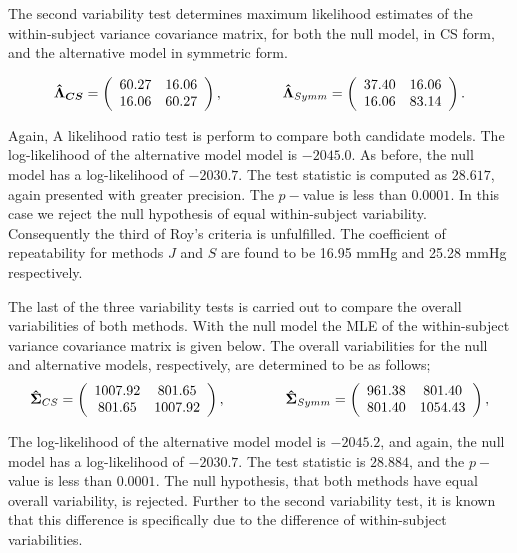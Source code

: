 \documentclass[12pt, a4paper]{report}
\theoremstyle{plain}
\theoremstyle{definition}
\theoremstyle{remark}
\begin{document}
	The second variability test determines maximum likelihood estimates of the within-subject variance covariance matrix, for both the null model, in CS form, and the alternative model in symmetric form.
	
	\[
	\boldsymbol{\hat{\Lambda}_{CS}} = \left( \begin{array}{cc}
	60.27  & 16.06  \\
	16.06  & 60.27  \\
	\end{array}\right),
	\hspace{1.5cm}
	\boldsymbol{\hat{\Lambda}}_{Symm} = \left( \begin{array}{cc}
	37.40 & 16.06  \\
	16.06 & 83.14  \\
	\end{array}\right).
	\]
	
	Again, A likelihood ratio test is perform to compare both candidate models. The log-likelihood of the alternative model model is $-2045.0$. As before, the null model has a log-likelihood of $-2030.7$. The test statistic is computed as $28.617$, again presented with greater precision. The $p-$value is less than $0.0001$. In this case we reject the null hypothesis of equal within-subject variability. Consequently the third of Roy's criteria is unfulfilled.
	The coefficient of repeatability for methods $J$ and $S$ are found to be 16.95 mmHg and 25.28 mmHg respectively.
	
	The last of the three variability tests is carried out to compare the overall variabilities of both methods.
	With the null model the MLE of the within-subject variance covariance matrix is given below. The overall variabilities for the null and alternative models, respectively, are determined to be as follows;
	\[
	\boldsymbol{\hat{\Sigma}}_{CS} = \left( \begin{array}{cc}
	1007.92  & 801.65  \\
	801.65  & 1007.92  \\
	\end{array}\right),
	\hspace{1.5cm}
	\boldsymbol{\hat{\Sigma}}_{Symm} = \left( \begin{array}{cc}
	961.38 & 801.40  \\
	801.40 & 1054.43  \\
	\end{array}\right),
	\]
	
	
	The log-likelihood of the alternative model model is $-2045.2$, and again, the null model has a log-likelihood of $-2030.7$. The test statistic is $28.884$, and the $p-$value is less than $0.0001$. The null hypothesis, that both methods have equal overall variability, is rejected. Further to the second variability test, it is known that this difference is specifically due to the difference of within-subject variabilities.
	
\end{document}
